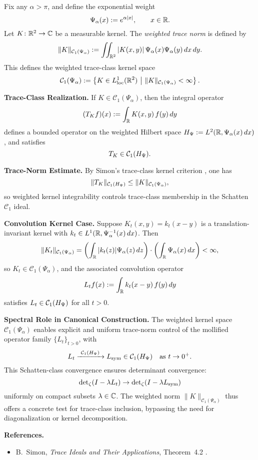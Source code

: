 \begin{definition}\label{def:weighted_trace_norm_space}
Fix any \( \alpha > \pi \), and define the exponential weight
\[
\Psi_\alpha(x) := e^{\alpha |x|}, \qquad x \in \mathbb{R}.
\]
Let \( K \colon \mathbb{R}^2 \to \mathbb{C} \) be a measurable kernel. The \emph{weighted trace norm} is defined by
\[
\| K \|_{\mathcal{C}_1(\Psi_\alpha)} := \iint_{\mathbb{R}^2} |K(x,y)| \, \Psi_\alpha(x) \Psi_\alpha(y)\, dx\,dy.
\]
This defines the weighted trace-class kernel space
\[
\mathcal{C}_1(\Psi_\alpha) := \left\{ K \in L^1_{\mathrm{loc}}(\mathbb{R}^2) \ \middle|\ \| K \|_{\mathcal{C}_1(\Psi_\alpha)} < \infty \right\}.
\]

\medskip
\noindent\textbf{Trace-Class Realization.}
If \( K \in \mathcal{C}_1(\Psi_\alpha) \), then the integral operator
\[
(T_K f)(x) := \int_{\mathbb{R}} K(x,y)\, f(y)\, dy
\]
defines a bounded operator on the weighted Hilbert space \( H_{\Psi} := L^2(\mathbb{R}, \Psi_\alpha(x)\, dx) \), and satisfies
\[
T_K \in \mathcal{C}_1(H_{\Psi}).
\]

\medskip
\noindent\textbf{Trace-Norm Estimate.}
By Simon’s trace-class kernel criterion \cite[Thm.~4.2]{Simon2005TraceIdeals}, one has
\[
\|T_K\|_{\mathcal{C}_1(H_{\Psi})} \le \|K\|_{\mathcal{C}_1(\Psi_\alpha)},
\]
so weighted kernel integrability controls trace-class membership in the Schatten \( \mathcal{C}_1 \) ideal.

\medskip
\noindent\textbf{Convolution Kernel Case.}
Suppose \( K_t(x,y) = k_t(x - y) \) is a translation-invariant kernel with \( k_t \in L^1(\mathbb{R}, \Psi_\alpha^{-1}(x)\, dx) \). Then
\[
\| K_t \|_{\mathcal{C}_1(\Psi_\alpha)} = \left( \int_{\mathbb{R}} |k_t(z)| \Psi_\alpha(z)\, dz \right) \cdot \left( \int_{\mathbb{R}} \Psi_\alpha(x)\, dx \right) < \infty,
\]
so \( K_t \in \mathcal{C}_1(\Psi_\alpha) \), and the associated convolution operator
\[
L_t f(x) := \int_{\mathbb{R}} k_t(x - y)\, f(y)\, dy
\]
satisfies \( L_t \in \mathcal{C}_1(H_{\Psi}) \) for all \( t > 0 \).

\medskip
\noindent\textbf{Spectral Role in Canonical Construction.}
The weighted kernel space \( \mathcal{C}_1(\Psi_\alpha) \) enables explicit and uniform trace-norm control of the mollified operator family \( \{L_t\}_{t > 0} \), with
\[
L_t \xrightarrow{\ \mathcal{C}_1(\HPsi)\ } L_{\sym} \in \mathcal{C}_1(\HPsi) \quad \text{as } t \to 0^+.
\]
This Schatten-class convergence ensures determinant convergence:
\[
\det\nolimits_\zeta(I - \lambda L_t) \to \det\nolimits_\zeta(I - \lambda L_{\mathrm{sym}})
\]
uniformly on compact subsets \( \lambda \in \mathbb{C} \). The weighted norm \( \|K\|_{\mathcal{C}_1(\Psi_\alpha)} \) thus offers a concrete test for trace-class inclusion, bypassing the need for diagonalization or kernel decomposition.

\medskip
\noindent\textbf{References.}
\begin{itemize}
    \item B.~Simon, \emph{Trace Ideals and Their Applications}, Theorem~4.2 \cite{Simon2005TraceIdeals}.
\end{itemize}
\end{definition}
